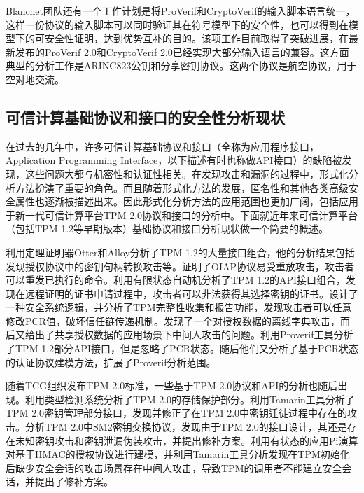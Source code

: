 Blanchet团队还有一个工作计划是将ProVerif和CryptoVerif的输入脚本语言统一，这样一份协议的输入脚本可以同时验证其在符号模型下的安全性，也可以得到在模型下的可安全性证明，达到优势互补的目的。该项工作目前取得了突破进展，在最新发布的ProVerif 2.0和CryptoVerif 2.0已经实现大部分输入语言的兼容。这方面典型的分析工作是ARINC823公钥和分享密钥协议\citep{blanchet2017symbolic}。这两个协议是航空协议，用于空对地交流。

\subsection{可信计算基础协议和接口的安全性分析现状}

在过去的几年中，许多可信计算基础协议和接口（全称为应用程序接口，Application Programming Interface，以下描述有时也称做API接口）的缺陷被发现，这些问题大都与机密性和认证性相关。在发现攻击和漏洞的过程中，形式化分析方法扮演了重要的角色。而且随着形式化方法的发展，匿名性和其他各类高级安全属性也逐渐被描述出来。因此形式化分析方法的应用范围也更加广阔，包括应用于新一代可信计算平台TPM 2.0协议和接口的分析中。下面就近年来可信计算平台（包括TPM 1.2等早期版本）基础协议和接口分析现状做一个简要的概述。

\citet{lin2005automated}利用定理证明器Otter和Alloy分析了TPM 1.2的大量接口组合，他的分析结果包括发现授权协议中的密钥句柄转换攻击等。\citet{bruschi2005replay}证明了OIAP协议易受重放攻击，攻击者可以重发已执行的命令。\citet{gurgens2007security}利用有限状态自动机分析了TPM 1.2的API接口组合，发现在远程证明的证书申请过程中，攻击者可以非法获得其选择密钥的证书。\citet{datta2009logic}设计了一种安全系统逻辑，并分析了TPM完整性收集和报告功能，发现攻击者可以任意修改PCR值，破坏信任链传递机制。\citet{chen2009offline}发现了一个对授权数据的离线字典攻击，而后又给出了共享授权数据的应用场景下中间人攻击的问题\citep{chen2009attack}。\citet{delaune2010formal}利用Proverif工具分析了TPM 1.2部分API接口，但是忽略了PCR状态。随后他们又分析了基于PCR状态的认证协议建模方法\citep{delaune2011formal}，扩展了Proverif分析范围。

随着TCG组织发布TPM 2.0标准，一些基于TPM 2.0协议和API的分析也随后出现。\citet{shao2013type}利用类型检测系统分析了TPM 2.0的存储保护部分。\citet{zhang2014formal}利用Tamarin工具分析了TPM 2.0密钥管理部分接口，发现并修正了在TPM 2.0中密钥迁徙过程中存在的攻击。\citet{zhao2015security}分析TPM 2.0中SM2密钥交换协议，发现由于TPM 2.0的接口设计，其还是存在未知密钥攻击和密钥泄漏伪装攻击，并提出修补方案。\cite{Shao2018Formal}利用有状态的应用Pi演算对基于HMAC的授权协议进行建模，并利用Tamarin工具分析发现在TPM初始化后缺少安全会话的攻击场景存在中间人攻击，导致TPM的调用者不能建立安全会话，并提出了修补方案。

